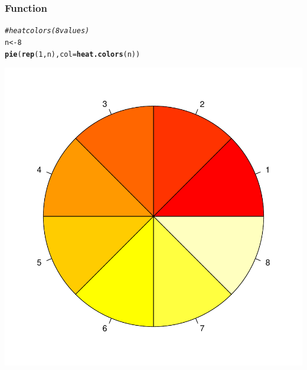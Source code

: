 \documentclass[12pt]{beamer}\usepackage[]{graphicx}\usepackage[]{color}
\makeatletter
\newcommand{\hlnum}[1]{\textcolor[rgb]{0.686,0.059,0.569}{#1}}%
\newcommand{\hlcom}[1]{\textcolor[rgb]{0.678,0.584,0.686}{\textit{#1}}}%
\newcommand{\hlstd}[1]{\textcolor[rgb]{0.345,0.345,0.345}{#1}}%
\newcommand{\hlkwb}[1]{\textcolor[rgb]{0.69,0.353,0.396}{#1}}%
\newcommand{\hlkwc}[1]{\textcolor[rgb]{0.333,0.667,0.333}{#1}}%
\newcommand{\hlkwd}[1]{\textcolor[rgb]{0.737,0.353,0.396}{\textbf{#1}}}%
\newenvironment{kframe}{%
 \def\at@end@of@kframe{}%
 \ifinner\ifhmode%
  \def\at@end@of@kframe{\end{minipage}}%
  \begin{minipage}{\columnwidth}%
 \fi\fi%
 \def\FrameCommand##1{\hskip\@totalleftmargin \hskip-\fboxsep
 \colorbox{shadecolor}{##1}\hskip-\fboxsep
     \hskip-\linewidth \hskip-\@totalleftmargin \hskip\columnwidth}%
 \MakeFramed {\advance\hsize-\width
   \@totalleftmargin\z@ \linewidth\hsize
   \@setminipage}}%
 {\par\unskip\endMakeFramed%
 \at@end@of@kframe}
\newenvironment{knitrout}{}{} %
\makeatother
\begin{document}

\begin{frame}[fragile]
\frametitle{Function }

\begin{knitrout}\scriptsize
{}\color{fgcolor}\begin{kframe}
\begin{alltt}
\hlcom{# heat colors (8 values)}
\hlstd{n} \hlkwb{<-} \hlnum{8}
\hlkwd{pie}\hlstd{(}\hlkwd{rep}\hlstd{(}\hlnum{1}\hlstd{, n),} \hlkwc{col} \hlstd{=} \hlkwd{heat.colors}\hlstd{(n))}
\end{alltt}
\end{kframe}

{\centering \includegraphics[width=.4\linewidth,height=.4\linewidth]{figure/heatcolors-1} 

}



\end{knitrout}

\end{frame}

\end{document}
